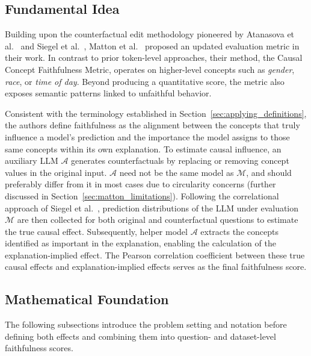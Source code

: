 \subsection{Fundamental Idea}
Building upon the counterfactual edit methodology pioneered by Atanasova et al.~\cite{atanasovaFaithfulnessTestsNatural2023} and Siegel et al.~\cite{siegelProbabilitiesAlsoMatter2024}, Matton et al.~\cite{mattonWalkTalkMeasuring2024} proposed an updated evaluation metric in their work. In contrast to prior token-level approaches, their method, the Causal Concept Faithfulness Metric, operates on higher-level concepts such as \textit{gender}, \textit{race}, or \textit{time of day}. Beyond producing a quantitative score, the metric also exposes semantic patterns linked to unfaithful behavior.

Consistent with the terminology established in Section~\ref{sec:applying_definitions}, the authors define faithfulness as the alignment between the concepts that truly influence a model's prediction and the importance the model assigns to those same concepts within its own explanation. To estimate causal influence, an auxiliary LLM $\mathcal{A}$ generates counterfactuals by replacing or removing concept values in the original input. $\mathcal{A}$ need not be the same model as $\mathcal{M}$, and should preferably differ from it in most cases due to circularity concerns (further discussed in Section~\ref{sec:matton_limitations}). Following the correlational approach of Siegel et al.~\cite{siegelProbabilitiesAlsoMatter2024}, prediction distributions of the LLM under evaluation $\mathcal{M}$ are then collected for both original and counterfactual questions to estimate the true causal effect. Subsequently, helper model $\mathcal{A}$ extracts the concepts identified as important in the explanation, enabling the calculation of the explanation-implied effect. The Pearson correlation coefficient between these true causal effects and explanation-implied effects serves as the final faithfulness score.
\subsection{Mathematical Foundation}
\label{sec:mathematical_foundation}
The following subsections introduce the problem setting and notation before defining both effects and combining them into question- and dataset-level faithfulness scores.

